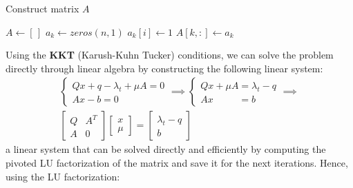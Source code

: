 \documentclass[notitlepage]{article}
\begin{document}
\begin{flushleft}
  \begin{minipage}{\textwidth}
    \begin{algorithm}[H]
      \caption{Construct matrix $A$}
      \begin{algorithmic}
          \State $A \gets \left[\,\right]$
            \State $a_k \gets zeros(n,1)$
                \State $a_k[i] \gets 1$
              \EndIf
            \EndFor
            \State $A[k,:] \gets a_k$
          \EndFor
        \EndProcedure
      \end{algorithmic}
    \end{algorithm}
  \end{minipage}  
\end{flushleft}
Using the {\bf KKT} (Karush-Kuhn Tucker) conditions, we can solve the problem directly through linear algebra by constructing the following linear system:
\begin{gather*}
  \begin{cases}
    Q x + q - \lambda_t + \mu A = 0 \\
    A x - b = 0
  \end{cases}
  \boldsymbol{\implies} 
  \begin{cases}
    Q x + \mu A = \lambda_t - q \\
    A x \quad \quad \:\ \,= b 
  \end{cases}
  \boldsymbol{\implies} \\ 
  \begin{bmatrix}
    Q & A^T \\[1ex]
    A & 0 
  \end{bmatrix}
  \begin{bmatrix}
    x \\[1ex]
    \mu
  \end{bmatrix}
  = 
  \begin{bmatrix}
    \lambda_t - q \\[1ex]
    b
  \end{bmatrix}
\end{gather*}
a linear system that can be solved directly and efficiently by computing the pivoted LU factorization of the matrix and save it for the next iterations. Hence, using the LU factorization:
\end{document}
